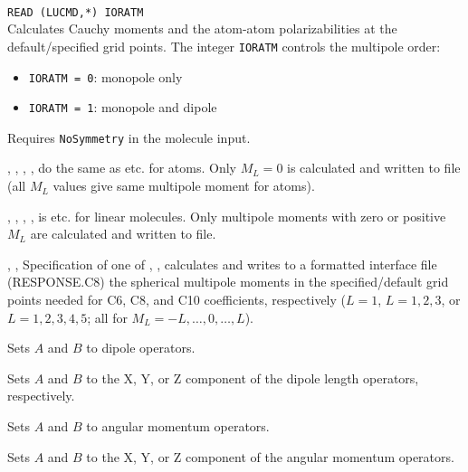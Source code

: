 \begin{description}

\item{}\\
\verb|READ (LUCMD,*) IORATM|\\
Calculates Cauchy moments and the atom-atom polarizabilities at the default/specified grid points.
The integer \verb|IORATM| controls the multipole order:
\begin{itemize}
  \item \verb|IORATM = 0|: monopole only
  \item \verb|IORATM = 1|: monopole and dipole 
\end{itemize}
Requires \verb|NoSymmetry| in the molecule input.

\item{, , }
, ,  do the same as  etc. for
atoms. Only $M_L=0$ is
calculated and written to file (all $M_L$ values give same multipole moment
for atoms).

\item{, , }
, ,  is  etc. for linear
molecules. Only
multipole moments with zero or positive $M_L$
are calculated and written to file.

\item{, , }
Specification of one of , , 
calculates and writes to a formatted interface file (RESPONSE.C8) the spherical multipole
moments in the specified/default grid points needed for C6, C8, and C10
coefficients, respectively ($L=1$, $L=1,2,3$, or $L=1,2,3,4,5$;
all for $M_L = -L,\ldots,0,\ldots,L$).

\item{}
Sets $A$ and $B$ to dipole operators.

\item{}
Sets $A$ and $B$ to the X, Y, or Z component of the dipole length operators, respectively.

\item{}
Sets $A$ and $B$ to angular momentum operators.

\item{}
Sets $A$ and $B$ to the X, Y, or Z component of the angular momentum operators.


\end{description}
